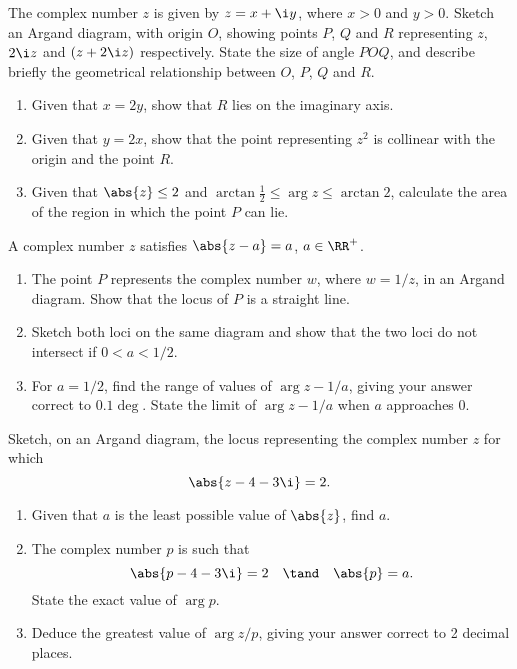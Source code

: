 \begin{problem}
    The complex number $z$ is given by $z = x + \i y$, where $x > 0$ and $y > 0$. Sketch an Argand diagram, with origin $O$, showing points $P$, $Q$ and $R$ representing $z$, $2\i z$ and $(z + 2\i z)$ respectively. State the size of angle $POQ$, and describe briefly the geometrical relationship between $O$, $P$, $Q$ and $R$.

    \begin{enumerate}
        \item Given that $x = 2y$, show that $R$ lies on the imaginary axis.
        \item Given that $y = 2x$, show that the point representing $z^2$ is collinear with the origin and the point $R$.
        \item Given that $\abs{z} \leq 2$ and $\arctan \frac12 \leq \arg z \leq \arctan 2$, calculate the area of the region in which the point $P$ can lie.
    \end{enumerate}
\end{problem}

\begin{problem}
    A complex number $z$ satisfies $\abs{z - a} = a$, $a \in \RR^+$.

    \begin{enumerate}
        \item The point $P$ represents the complex number $w$, where $w = 1/z$, in an Argand diagram. Show that the locus of $P$ is a straight line.
        \item Sketch both loci on the same diagram and show that the two loci do not intersect if $0 < a < 1/2$.
        \item For $a = 1/2$, find the range of values of $\arg{z - 1/a}$, giving your answer correct to $0.1\deg$. State the limit of $\arg{z - 1/a}$ when $a$ approaches 0.
    \end{enumerate}
\end{problem}

\begin{problem}
    Sketch, on an Argand diagram, the locus representing the complex number $z$ for which \[\abs{z - 4 - 3\i} = 2.\]

    \begin{enumerate}
        \item Given that $a$ is the least possible value of $\abs{z}$, find $a$.
        \item The complex number $p$ is such that \[\abs{p - 4 - 3\i} = 2 \quad \tand \quad \abs{p} = a.\] State the exact value of $\arg p$.
        \item Deduce the greatest value of $\arg{z/p}$, giving your answer correct to 2 decimal places.
    \end{enumerate}
\end{problem}

